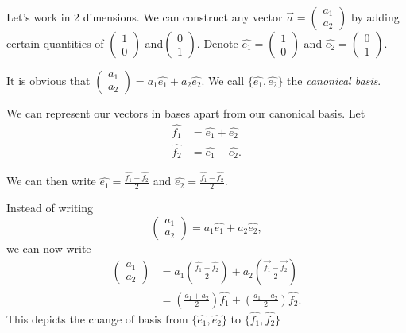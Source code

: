 \documentclass[a4paper, 12pt,oneside,openany]{book}
\begin{document}

Let's work in 2 dimensions. We can construct any vector $\vec{a}=\begin{pmatrix} a_1 \\a_2  \end{pmatrix}$ by adding certain quantities of $\begin{pmatrix} 1 \\0  \end{pmatrix}$ and$ \begin{pmatrix} 0 \\1  \end{pmatrix}$. Denote $\hat{e_1}=\begin{pmatrix} 1 \\0  \end{pmatrix}$ and $\hat{e_2}=\begin{pmatrix} 0 \\1  \end{pmatrix}$. 

It is obvious that $\begin{pmatrix} a_1 \\a_2  \end{pmatrix} = a_1 \hat{e_1} + a_2\hat{e_2}.$ We call $\{\hat{e_1}, \hat{e_2}\}$ the \emph{canonical basis}.

We can represent our vectors in bases apart from our canonical basis. Let \begin{align*} \hat{f_1} &= \hat{e_1} + \hat{e_2}\\ \hat{f_2} &= \hat{e_1} - \hat{e_2} .\end{align*} 

We can then write $\hat{e_1} = \frac{\hat{f_1}+\hat{f_2}}{2}$ and $\hat{e_2} = \frac{\hat{f_1}-\hat{f_2}}{2}$. 

Instead of writing $$\begin{pmatrix} a_1 \\a_2  \end{pmatrix} = a_1 \hat{e_1} + a_2\hat{e_2},$$ we can now write \begin{align*} \begin{pmatrix} a_1 \\a_2  \end{pmatrix} &= a_1 \left(\frac{\hat{f_1}+\hat{f_2}}{2} \right) + a_2 \left( \frac{\vec{f_1}-\vec{f_2}}{2} \right)\\ &= \left(\frac{a_1+a_2}{2}\right) \hat{f_1} + \left(\frac{a_1-a_2}{2}\right) \hat{f_2}. \end{align*} This depicts the change of basis from $\{\hat{e_1}, \hat{e_2} \}$ to $\{\hat{f_1}, \hat{f_2} \}$
\end{document}
